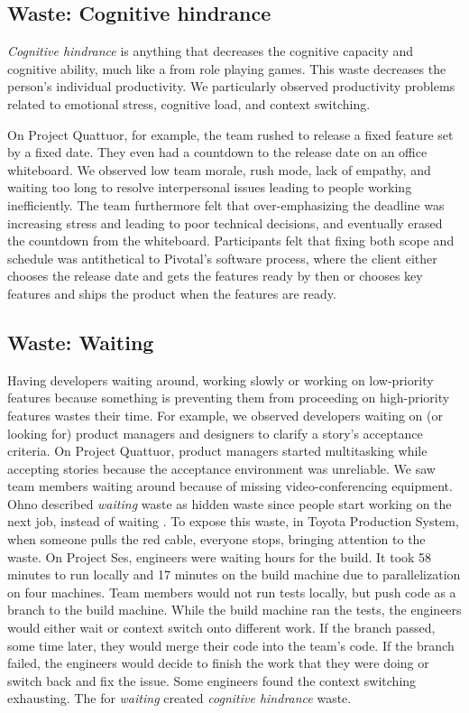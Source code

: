 \subsection{Waste: Cognitive hindrance}
\textit{Cognitive hindrance} is anything that decreases the cognitive capacity and cognitive ability, much like a  from role playing games. This waste decreases the person's individual productivity. We particularly observed productivity problems related to emotional stress, cognitive load, and context switching.

On Project Quattuor, for example, the team rushed to release a fixed feature set by a fixed date. They even had a countdown to the release date on an office whiteboard. We observed low team morale, rush mode, lack of empathy, and waiting too long to resolve interpersonal issues leading to people working inefficiently. The team furthermore felt that over-emphasizing the deadline was increasing stress and leading to poor technical decisions, and eventually erased the countdown from the whiteboard. Participants felt that fixing both scope and schedule was antithetical to Pivotal's software process, where the client either chooses the release date and gets the features ready by then or chooses key features and ships the product when the features are ready. 
\subsection{Waste: Waiting}
Having developers waiting around, working slowly or working on low-priority features because something is preventing them from proceeding on high-priority features wastes their time. For example, we observed developers waiting on (or looking for) product managers and designers to clarify a story's acceptance criteria. On Project Quattuor, product managers started multitasking while accepting stories because the acceptance environment was unreliable. We saw team members waiting around because of missing video-conferencing equipment. 
Ohno described \textit{waiting} waste as hidden waste since people start working on the next job, instead of waiting \cite{OhnoToyotaProductionSystem}. To expose this waste, in Toyota Production System, when someone pulls the red cable, everyone stops, bringing attention to the waste. On Project Ses, engineers were waiting hours for the build. It took 58 minutes to run locally and 17 minutes on the build machine due to parallelization on four machines. Team members would not run tests locally, but push code as a branch to the build machine. While the build machine ran the tests, the engineers would either wait or context switch onto different work. If the branch passed, some time later, they would merge their code into the team's code. If the branch failed, the engineers would decide to finish the work that they were doing or switch back and fix the issue. Some engineers found the context switching exhausting. The  for \textit{waiting} created \textit{cognitive hindrance} waste.

